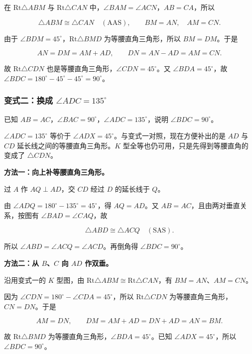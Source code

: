 在 $\mathrm{Rt}\triangle ABM$ 与 $\mathrm{Rt}\triangle CAN$ 中，$\angle BAM=\angle ACN$，$AB=CA$，所以

\[
\triangle ABM\cong\triangle CAN\quad(\mathrm{AAS}),
\qquad BM=AN,\quad AM=CN.
\]


由于 $\angle BDM=45^\circ$，$\mathrm{Rt}\triangle BMD$ 为等腰直角三角形，所以 $BM=DM$。于是

\[
AN=DM=AM+AD,
\qquad DN=AN-AD=AM=CN.
\]

故 $\mathrm{Rt}\triangle CDN$ 也是等腰直角三角形，$\angle CDN=45^\circ$。又 $\angle BDA=45^\circ$，故 $\angle BDC=180^\circ-45^\circ-45^\circ=90^\circ$。


\subsubsection*{\texorpdfstring{变式二：换成 $\angle ADC=135^\circ$}{变式二：换成 ∠ADC＝135°}}

已知 $AB=AC$，$\angle BAC=90^\circ$，$\angle ADC=135^\circ$，说明 $\angle BDC=90^\circ$。

\think

$\angle ADC=135^\circ$ 等价于 $\angle ADX=45^\circ$。与变式一对照，现在方便补出的是 $AD$ 与 $CD$ 延长线之间的等腰直角三角形。$K$ 型全等也仍可用，只是先得到等腰直角的变成了 $\triangle CDN$。

\textbf{方法一：向上补等腰直角三角形。}

过 $A$ 作 $AQ\perp AD$，交 $CD$ 经过 $D$ 的延长线于 $Q$。

\esdiagram{\esdiHandUpper}

由 $\angle ADQ=180^\circ-135^\circ=45^\circ$，得 $AQ=AD$。又 $AB=AC$，且由两对垂直关系，按图有 $\angle BAD=\angle CAQ$，故

\[
\triangle ABD\cong\triangle ACQ\quad(\mathrm{SAS}).
\]

所以 $\angle ABD=\angle ACQ=\angle ACD$。再倒角得 $\angle BDC=90^\circ$。

\textbf{方法二：从 $B$、$C$ 向 $AD$ 作双垂。}

沿用变式一的 $K$ 型图，由 $\mathrm{Rt}\triangle ABM\cong \mathrm{Rt}\triangle CAN$，有 $BM=AN$、$AM=CN$。

因为 $\angle CDN=180^\circ-\angle CDA=45^\circ$，所以 $\mathrm{Rt}\triangle CDN$ 为等腰直角三角形，$CN=DN$。于是

\[
AM=DN,
\qquad DM=AM+AD=DN+AD=AN=BM.
\]

故 $\mathrm{Rt}\triangle BMD$ 为等腰直角三角形，$\angle BDA=45^\circ$。已知 $\angle ADX=45^\circ$，所以 $\angle BDC=90^\circ$。

